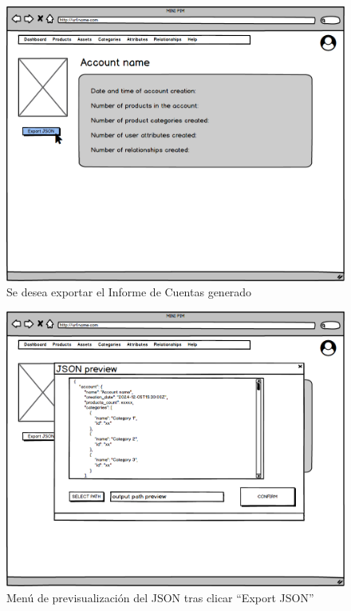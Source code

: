 \begin{figure}[H]
    \includegraphics[width=1\linewidth]{assets/mockups/RF1.9.1_1ExportarInformeCuenta.png}
    \caption{Se desea exportar el Informe de Cuentas generado}
   \end{figure}
\vspace{1.0cm}

\begin{figure}[H]
    \includegraphics[width=1\linewidth]{assets/mockups/RF1.9.1_2ExportarInformeCuenta.png}
    \caption{Menú de previsualización del JSON tras clicar \enquote{Export JSON}}
   \end{figure}
\vspace{1.0cm}

